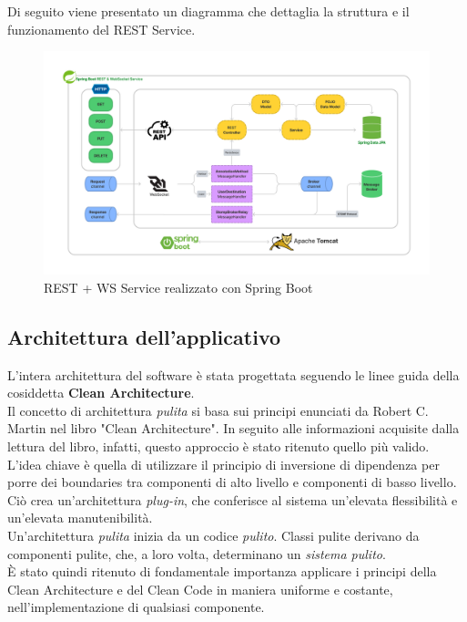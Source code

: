 \documentclass{natourDoc}
\begin{document}
\newpage
Di seguito viene presentato un diagramma che dettaglia la struttura e il funzionamento del REST Service.
\begin{figure}[!htbp]
	\centering
	\includegraphics[width=\textwidth]{./diagrams/spring.pdf}
	\caption{REST + WS Service realizzato con Spring Boot}
\end{figure}

\newpage
\subsection{Architettura dell’applicativo}
L'intera architettura del software è stata progettata seguendo le linee guida della cosiddetta \textbf{Clean Architecture}. \\
Il concetto di architettura \textit{pulita} si basa sui principi enunciati da Robert C. Martin nel libro "Clean Architecture".
In seguito alle informazioni acquisite dalla lettura del libro, infatti, questo approccio è stato ritenuto quello più valido.\\
L’idea chiave è quella di utilizzare il principio di inversione di dipendenza per porre dei boundaries tra componenti di alto livello e componenti di basso livello.
Ciò crea un’architettura \textit{plug-in},
che conferisce al sistema un’elevata flessibilità e un'elevata manutenibilità. \\
Un’architettura \textit{pulita} inizia da un codice \textit{pulito}. Classi pulite derivano da componenti pulite, che, a loro volta, determinano un \textit{sistema pulito}.\\
È stato quindi ritenuto di fondamentale importanza applicare i principi della Clean Architecture e del Clean Code in maniera uniforme e costante, nell'implementazione di qualsiasi componente.\\
\end{document}
